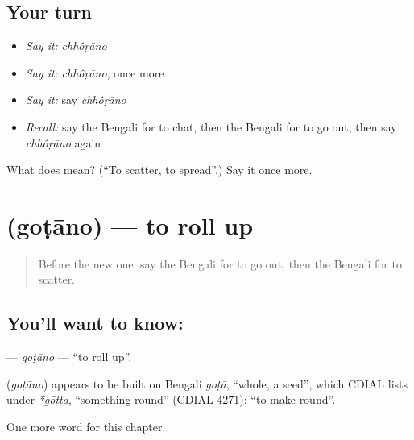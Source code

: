 \subsection*{Your turn}
\begin{itemize}
\raggedright
  \item \emph{Say it:} \emph{chhôṛāno}
  \item \emph{Say it:} \emph{chhôṛāno}, once more
  \item \emph{Say it:} say \emph{chhôṛāno}
  \item \emph{Recall:} say the Bengali for to chat, then the Bengali for to go out, then say \emph{chhôṛāno} again
\end{itemize}

\begin{tcolorbox}[breakable,colback=teal!4,colframe=teal!35!black,title={Before you move on}]
What does  mean? (\textquotedblleft{}To scatter, to spread\textquotedblright{}.) Say it once more.
\end{tcolorbox}
\section[\texorpdfstring{\bn{গোটানো} (goṭāno)}{গোটানো (goṭāno)}]{ (goṭāno) — to roll up}

\label{lesson:BN-C242-gotano}



\begin{quote}
Before the new one: say the Bengali for to go out, then the Bengali for to scatter.
\end{quote}

\subsection*{You'll want to know: }
\textbf{} — \emph{goṭāno} — \textquotedblleft{}to roll up\textquotedblright{}.

\begin{cousinweb}
\textbf{} (\emph{goṭāno}) appears to be built on Bengali \emph{goṭā}, \textquotedblleft{}whole, a seed\textquotedblright{}, which CDIAL lists under \emph{*gōṭṭa}, \textquotedblleft{}something round\textquotedblright{} (CDIAL 4271): \textquotedblleft{}to make round\textquotedblright{}.
\end{cousinweb}

\begin{grammarlens}[title={What you've built}]
One more word for this chapter.
\end{grammarlens}

